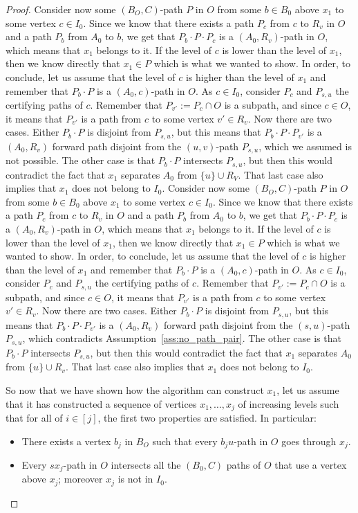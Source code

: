 \documentclass[utf8,11pt]{article}
\theoremstyle{plain}
\theoremstyle{definition}
\begin{document}
\begin{proof}
Consider now some $(B_O, C)$-path $P$ in $O$ from some $b \in B_0$ above $x_1$ to some vertex $c \in I_0$. Since we know that there exists a path $P_c$ from $c$ to $R_v$ in $O$ and a path $P_b$ from $A_0$ to $b$, we get that $P_b \cdot P \cdot P_c$ is a $(A_0, R_v)$-path in $O$, which means that $x_1$ belongs to it. If the level of $c$ is lower than the level of $x_1$, then we know directly that $x_1 \in P$ which is what we wanted to show. In order, to conclude, let us assume that the level of $c$ is higher than the level of $x_1$ and remember that $P_b \cdot P$ is a $(A_0, c)$-path in $O$. As $c \in I_0$, consider $P_c$ and $P_{s,u}$ the certifying paths of $c$. Remember that $P_{v'} := P_c \cap O$ is a subpath, and since $c \in O$, it means that $P_{v'}$ is a path from $c$ to some vertex $v' \in R_v$. Now there are two cases. Either $P_b \cdot P$ is disjoint from $P_{s,u}$, but this means that $P_b \cdot P \cdot P_{v'}$ is a $(A_0, R_v)$ forward path disjoint from the $(u,v)$-path $P_{s,u}$, which we assumed is not possible. The other case is that $P_b \cdot P$ intersects $P_{s,u}$, but then this would contradict the fact that $x_1$ separates $A_0$ from $\{u\} \cup R_V$. That last case also implies that $x_1$ does not belong to $I_0$.
Consider now some $(B_O, C)$-path $P$ in $O$ from some $b \in B_0$ above $x_1$ to some vertex $c \in I_0$. Since we know that there exists a path $P_c$ from $c$ to $R_v$ in $O$ and a path $P_b$ from $A_0$ to $b$, we get that $P_b \cdot P \cdot P_c$ is a $(A_0, R_v)$-path in $O$, which means that $x_1$ belongs to it. If the level of $c$ is lower than the level of $x_1$, then we know directly that $x_1 \in P$ which is what we wanted to show. In order, to conclude, let us assume that the level of $c$ is higher than the level of $x_1$ and remember that $P_b \cdot P$ is a $(A_0, c)$-path in $O$. As $c \in I_0$, consider $P_c$ and $P_{s,u}$ the certifying paths of $c$. Remember that $P_{v'} := P_c \cap O$ is a subpath, and since $c \in O$, it means that $P_{v'}$ is a path from $c$ to some vertex $v' \in R_v$. Now there are two cases. Either $P_b \cdot P$ is disjoint from $P_{s,u}$, but this means that $P_b \cdot P \cdot P_{v'}$ is a $(A_0, R_v)$ forward path disjoint from the $(s,u)$-path $P_{s,u}$, which contradicts Assumption~\ref{ass:no_path_pair}. The other case is that $P_b \cdot P$ intersects $P_{s,u}$, but then this would contradict the fact that $x_1$ separates $A_0$ from $\{u\} \cup R_v$. That last case also implies that $x_1$ does not belong to $I_0$.


So now that we have shown how the algorithm can construct $x_1$, let us assume that it has constructed a sequence of vertices $x_1, \dots, x_j$ of increasing levels such that for all of $ i\in [j]$, the first two properties are satisfied. In particular: 
    \begin{itemize}
        \item There exists a vertex $b_{j}$ in $B_O$ such that every $b_{j}u$-path in $O$ goes through $x_{j}$.
        \item Every $sx_j$-path in $O$ intersects all the $(B_0,C)$ paths of $O$ that use a vertex above $x_j$; moreover $x_j$ is not in $I_0$.  
    \end{itemize}


\end{proof}
\end{document}

